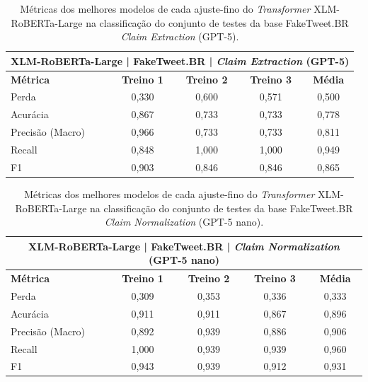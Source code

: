 \begin{table}[!htbp]
\centering
\begin{tabular}{l*4c}
\toprule
\multicolumn{5}{c}{\textbf{XLM-RoBERTa-Large | FakeTweet.BR | \textit{Claim Extraction} (GPT-5)}} \\ 
\midrule
\textbf{Métrica} & \textbf{Treino 1} & \textbf{Treino 2} & \textbf{Treino 3} & \textbf{Média} \\ 
\midrule
Perda & 0,330 & 0,600 & 0,571 & 0,500 \\ 
Acurácia & 0,867 & 0,733 & 0,733 & 0,778 \\ 
Precisão (Macro) & 0,966 & 0,733 & 0,733 & 0,811 \\ 
Recall & 0,848 & 1,000 & 1,000 & 0,949 \\ 
F1 & 0,903 & 0,846 & 0,846 & 0,865 \\ 
\bottomrule
\end{tabular}
\caption{Métricas dos melhores modelos de cada ajuste-fino do \textit{Transformer} XLM-RoBERTa-Large na classificação do conjunto de testes da base FakeTweet.BR \textit{Claim Extraction} (GPT-5).}
\end{table}

\begin{table}[!htbp]
\centering
\begin{tabular}{l*4c}
\toprule
\multicolumn{5}{c}{\textbf{XLM-RoBERTa-Large | FakeTweet.BR | \textit{Claim Normalization} (GPT-5 nano)}} \\ 
\midrule
\textbf{Métrica} & \textbf{Treino 1} & \textbf{Treino 2} & \textbf{Treino 3} & \textbf{Média} \\ 
\midrule
Perda & 0,309 & 0,353 & 0,336 & 0,333 \\ 
Acurácia & 0,911 & 0,911 & 0,867 & 0,896 \\ 
Precisão (Macro) & 0,892 & 0,939 & 0,886 & 0,906 \\ 
Recall & 1,000 & 0,939 & 0,939 & 0,960 \\ 
F1 & 0,943 & 0,939 & 0,912 & 0,931 \\ 
\bottomrule
\end{tabular}
\caption{Métricas dos melhores modelos de cada ajuste-fino do \textit{Transformer} XLM-RoBERTa-Large na classificação do conjunto de testes da base FakeTweet.BR \textit{Claim Normalization} (GPT-5 nano).}
\end{table}

